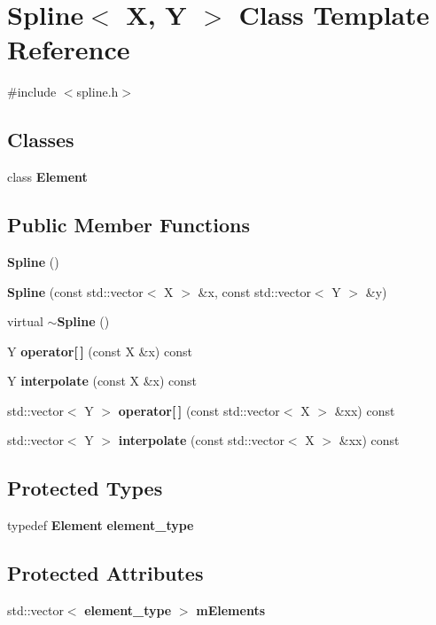 \section{\-Spline$<$ \-X, \-Y $>$ \-Class \-Template \-Reference}
\label{classSpline}


{\ttfamily \#include $<$spline.\-h$>$}

\subsection*{\-Classes}
\begin{DoxyCompactItemize}
\item 
class {\bf \-Element}
\end{DoxyCompactItemize}
\subsection*{\-Public \-Member \-Functions}
\begin{DoxyCompactItemize}
\item 
{\bf \-Spline} ()
\item 
{\bf \-Spline} (const std\-::vector$<$ \-X $>$ \&x, const std\-::vector$<$ \-Y $>$ \&y)
\item 
virtual {\bf $\sim$\-Spline} ()
\item 
\-Y {\bf operator[$\,$]} (const \-X \&x) const 
\item 
\-Y {\bf interpolate} (const \-X \&x) const 
\item 
std\-::vector$<$ \-Y $>$ {\bf operator[$\,$]} (const std\-::vector$<$ \-X $>$ \&xx) const 
\item 
std\-::vector$<$ \-Y $>$ {\bf interpolate} (const std\-::vector$<$ \-X $>$ \&xx) const 
\end{DoxyCompactItemize}
\subsection*{\-Protected \-Types}
\begin{DoxyCompactItemize}
\item 
typedef {\bf \-Element} {\bf element\-\_\-type}
\end{DoxyCompactItemize}
\subsection*{\-Protected \-Attributes}
\begin{DoxyCompactItemize}
\item 
std\-::vector$<$ {\bf element\-\_\-type} $>$ {\bf m\-Elements}
\end{DoxyCompactItemize}


